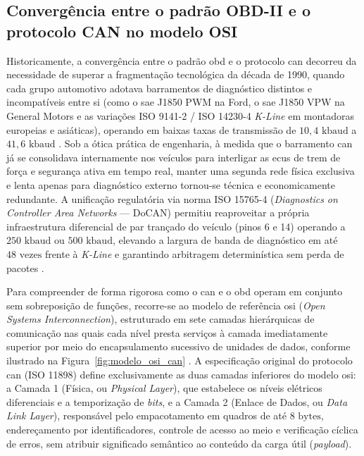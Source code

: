\documentclass[
	12pt,				%
	openright,			%
	twoside,			%
	a4paper,			%
	english,			%
	brazil				%
	]{abntex2}
\newcounter{quadro}
\begin{document}
\subsection{Convergência entre o padrão OBD-II e o protocolo CAN no modelo
OSI}\label{sec:convergencia_osi}

Historicamente, a convergência entre o padrão \acrshort{obd} e o protocolo
\acrshort{can} decorreu da necessidade de superar a fragmentação tecnológica da década
de
1990, quando cada grupo automotivo adotava barramentos de diagnóstico distintos e
incompatíveis entre si (como o \acrshort{sae} J1850 PWM na Ford, o \acrshort{sae} J1850
VPW na General Motors e as variações ISO 9141-2 / ISO 14230-4 \textit{K-Line} em
montadoras europeias e asiáticas), operando em baixas taxas de transmissão de
$10{,}4\text{ kbaud}$ a $41{,}6\text{ kbaud}$ \cite{guimaraes2007}. Sob a ótica prática
de engenharia, à medida que o barramento \acrshort{can} já se consolidava internamente
nos veículos para interligar as \acrshort{ecu}s de trem de força e segurança ativa em
tempo real, manter uma segunda rede física exclusiva e lenta apenas para diagnóstico
externo tornou-se técnica e economicamente redundante. A unificação regulatória via
norma ISO 15765-4 (\textit{Diagnostics on Controller Area Networks} --- DoCAN) permitiu
reaproveitar a própria infraestrutura diferencial de par trançado do veículo (pinos 6 e
14) operando a $250\text{ kbaud}$ ou $500\text{ kbaud}$, elevando a largura de banda de
diagnóstico em até $48\text{ vezes}$ frente à \textit{K-Line} e garantindo arbitragem
determinística sem perda de pacotes \cite{iso15765}.

Para compreender de forma rigorosa como o \acrshort{can} e o \acrshort{obd} operam em
conjunto sem sobreposição de funções, recorre-se ao modelo de referência \acrshort{osi}
(\textit{Open Systems Interconnection}), estruturado em sete camadas hierárquicas de
comunicação nas quais cada nível presta serviços à camada imediatamente superior por
meio do encapsulamento sucessivo de unidades de dados, conforme ilustrado na
Figura~\ref{fig:modelo_osi_can} \cite{tanenbaum2011,lugli2009}. A especificação original
do protocolo \acrshort{can} (ISO 11898) define exclusivamente as duas camadas inferiores
do modelo \acrshort{osi}: a Camada 1 (Física, ou \textit{Physical Layer}), que
estabelece os níveis elétricos diferenciais e a temporização de \textit{bits}, e a
Camada 2 (Enlace de Dados, ou \textit{Data Link Layer}), responsável pelo empacotamento
em quadros de até $8\text{ bytes}$, endereçamento por identificadores, controle de
acesso ao meio e verificação cíclica de erros, sem atribuir significado semântico ao
conteúdo da carga útil (\textit{payload}).
\end{document}
